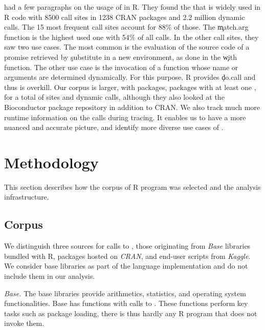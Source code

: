\documentclass[screen,acmsmall]{acmart}
\newcommand{\mypara}[1]{\medskip\noindent\emph{#1}\xspace}
\begin{document}
\citet{ecoop12} had a few paragraphs on the usage of \eval in R. They found the
that \eval  is widely used in R code with 8500 call sites in 1238 CRAN packages and 2.2 million dynamic calls.   The 15 most frequent call sites account for 88\% of those. The
\c{match.arg} function is the highest used one with 54\% of all calls. In the
other call sites, they saw two use cases. The most common is the evaluation of
the source code of a promise retrieved by \c{substitute} in a new environment,
\eg as done in the \c{with} function. The other use case is the invocation of a
function whose name or arguments are determined dynamically. For this purpose, R provides \c{do.call} and thus \eval is overkill. Our corpus is larger, with \CranPackages packages, \packageTriggeredpkgs packages with at least one \eval, for a total of \PkgHitEvalCallSites sites and \packageAllcallsRnd dynamic calls, although they also looked at the Bioconductor package repository in addition to CRAN. We also track much more runtime information on the \eval calls during tracing. It enables us to have a more nuanced and accurate picture, and identify more diverse use cases of \eval.



\section{Methodology}

This section describes how the corpus of R program was selected and the analysis
infrastructure.

\subsection{Corpus}

We distinguish three sources for calls to \eval, those originating from
\emph{Base} libraries bundled with R, packages hosted on \emph{CRAN}, and
end-user scripts from \emph{Kaggle}. We consider base libraries as part of the
language implementation and do not include them in our analysis.

\mypara{Base.} The \BasePackages base libraries provide arithmetics, statistics,
and operating system functionalities. Base has \BaseFunsWithEvals functions with
\BaseEvalCallSites calls to \eval. These functions perform key tasks such as
package loading, there is thus hardly any R program that does not invoke them.
\end{document}
